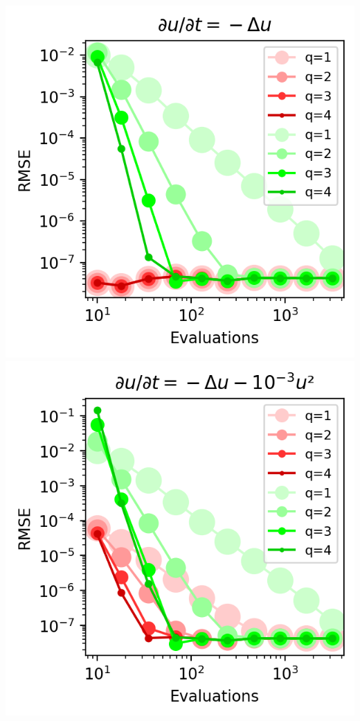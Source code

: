 \begin{center}
    \includegraphics[width=\columnwidth]{../images/solver_heat.png}
    \label{fig:heat}
    \includegraphics[width=\columnwidth]{../images/solver_heat and medium square.png}

\end{center}
